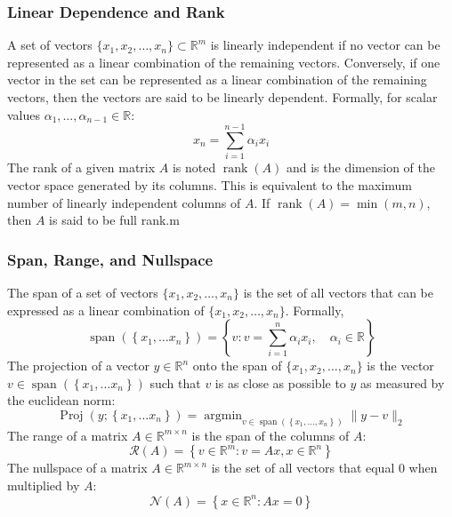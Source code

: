 \documentclass[twoside,twocolumn]{article}
\begin{document}
\subsubsection{Linear Dependence and Rank}
A set of vectors $\{x_1, x_2, \hdots, x_n\} \subset \mathbb{R}^m$ is linearly
independent if no vector can be represented as a linear combination of the
remaining vectors. Conversely, if one vector in the set can be represented
as a linear combination of the remaining vectors, then the vectors are
said to be linearly dependent. Formally, for scalar values
$\alpha_1, \hdots, \alpha_{n-1} \in \mathbb{R}$:
\begin{equation}
  x_n = \sum_{i=1}^{n-1} \alpha_i x_i
\end{equation}
The rank of a given matrix $A$ is noted $\operatorname{rank}(A)$
and is the dimension of the vector space generated by its columns.
This is equivalent to the maximum number of linearly independent columns of
$A$. If $\operatorname{rank}(A) = \min(m,n)$, then $A$ is said to be full rank.m
\subsubsection{Span, Range, and Nullspace}
The span of a set of vectors $\{x_1, x_2, \hdots, x_n\}$ is the set of all
vectors that can be expressed as a linear combination of
$\{x_1, x_2, \hdots, x_n\}$. Formally,
\begin{equation}
  \operatorname { span } \left( \left\{ x _ { 1 } , \ldots x _ { n } \right\} \right) = \left\{ v : v = \sum _ { i = 1 } ^ { n } \alpha _ { i } x _ { i } , \quad \alpha _ { i } \in \mathbb { R } \right\}
\end{equation}
The projection of a vector $y \in \mathbb{R}^n$ onto the span of
$\{x_1, x_2, \hdots, x_n\}$ is the vector
$v \in \operatorname { span } \left( \left\{ x _ { 1 } , \ldots x _ { n } \right\} \right)$
such that $v$ is as close as possible to $y$ as measured by the euclidean norm:
\begin{equation}
  \operatorname { Proj } \left( y ; \left\{ x _ { 1 } , \ldots x _ { n } \right\} \right) = \operatorname { argmin } _ { v \in \operatorname { span } \left( \left\{ x _ { 1 } , \ldots , x _ { n } \right\} \right) } \| y - v \| _ { 2 }
\end{equation}
The range of a matrix $A\in \mathbb{R}^{m \times n}$ is the span of the columns
of $A$:
\begin{equation}
  \mathcal { R } ( A ) = \left\{ v \in \mathbb { R } ^ { m } : v = A x , x \in \mathbb { R } ^ { n } \right\}
\end{equation}
The nullspace of a matrix $A \in \mathbb{R}^{m \times n}$ is the set of all
vectors that equal $0$ when multiplied by $A$:
\begin{equation}
  \mathcal { N } ( A ) = \left\{ x \in \mathbb { R } ^ { n } : A x = 0 \right\}
\end{equation}
\end{document}
